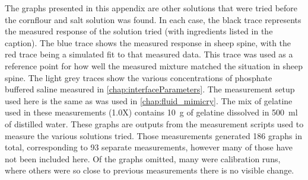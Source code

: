 The graphs presented in this appendix are other solutions that were tried before the cornflour and salt solution was found.
In each case, the black trace represents the measured response of the solution tried (with ingredients listed in the caption).
The blue trace shows the measured response in sheep spine, with the red trace being a simulated fit to that measured data.
This trace was used as a reference point for how well the measured mixture matched the situation in sheep spine.
The light grey traces show the various concentrations of phosphate buffered saline measured in \cref{chap:interfaceParameters}.
The measurement setup used here is the same as was used in \cref{chap:fluid_mimicry}.
The mix of gelatine used in these measurements (1.0X) contains \SI{10}{\gram} of gelatine dissolved in \SI{500}{\milli\litre} of distilled water.
These graphs are outputs from the measurement scripts used to measure the various solutions tried.
Those measurements generated 186 graphs in total, corresponding to 93 separate measurements, however many of those have not been included here.
Of the graphs omitted, many were calibration runs, where others were so close to previous measurements there is no visible change.


